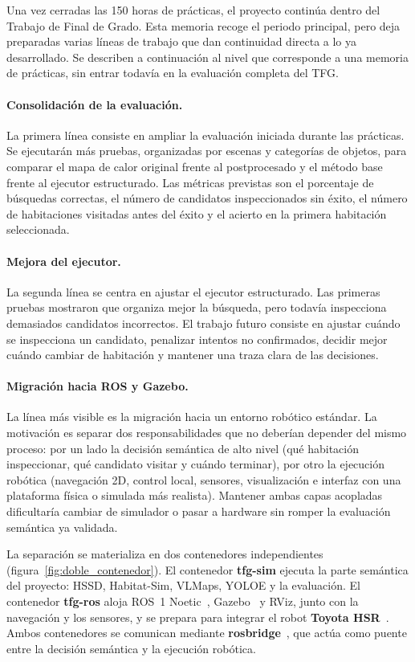 \documentclass[11pt,fleqn,openany]{book} %
\let\cite=\parencite
\begin{document}
Una vez cerradas las 150 horas de prácticas, el proyecto continúa dentro del Trabajo de Final de Grado. Esta memoria recoge el periodo principal, pero deja preparadas varias líneas de trabajo que dan continuidad directa a lo ya desarrollado. Se describen a continuación al nivel que corresponde a una memoria de prácticas, sin entrar todavía en la evaluación completa del TFG.

\paragraph{Consolidación de la evaluación.} La primera línea consiste en ampliar la evaluación iniciada durante las prácticas. Se ejecutarán más pruebas, organizadas por escenas y categorías de objetos, para comparar el mapa de calor original frente al postprocesado y el método base frente al ejecutor estructurado. Las métricas previstas son el porcentaje de búsquedas correctas, el número de candidatos inspeccionados sin éxito, el número de habitaciones visitadas antes del éxito y el acierto en la primera habitación seleccionada.

\paragraph{Mejora del ejecutor.} La segunda línea se centra en ajustar el ejecutor estructurado. Las primeras pruebas mostraron que organiza mejor la búsqueda, pero todavía inspecciona demasiados candidatos incorrectos. El trabajo futuro consiste en ajustar cuándo se inspecciona un candidato, penalizar intentos no confirmados, decidir mejor cuándo cambiar de habitación y mantener una traza clara de las decisiones.

\paragraph{Migración hacia ROS y Gazebo.} La línea más visible es la migración hacia un entorno robótico estándar. La motivación es separar dos responsabilidades que no deberían depender del mismo proceso: por un lado la decisión semántica de alto nivel (qué habitación inspeccionar, qué candidato visitar y cuándo terminar), por otro la ejecución robótica (navegación 2D, control local, sensores, visualización e interfaz con una plataforma física o simulada más realista). Mantener ambas capas acopladas dificultaría cambiar de simulador o pasar a hardware sin romper la evaluación semántica ya validada.

La separación se materializa en dos contenedores independientes (figura~\ref{fig:doble_contenedor}). El contenedor \textbf{tfg-sim} ejecuta la parte semántica del proyecto: HSSD, Habitat-Sim, VLMaps, YOLOE y la evaluación. El contenedor \textbf{tfg-ros} aloja ROS~1 Noetic~\cite{quigley2009ros}, Gazebo~\cite{koenig2004gazebo} y RViz, junto con la navegación y los sensores, y se prepara para integrar el robot \textbf{Toyota HSR}~\cite{yamamoto2019hsr}. Ambos contenedores se comunican mediante \textbf{rosbridge}~\cite{crick2017rosbridge}, que actúa como puente entre la decisión semántica y la ejecución robótica.
\end{document}
